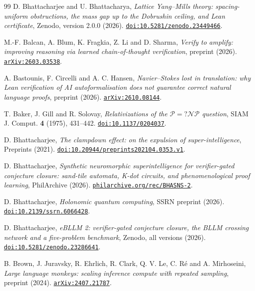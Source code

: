 \begin{thebibliography}{99}
D. Bhattacharjee and U. Bhattacharya,
\emph{Lattice Yang--Mills theory: spacing-uniform obstructions, the mass gap up to the Dobrushin ceiling, and Lean certificate},
Zenodo, version 2.0.0 (2026).
\href{https://doi.org/10.5281/zenodo.23449466}{\nolinkurl{doi:10.5281/zenodo.23449466}}.

M.-F. Balcan, A. Blum, K. Fragkia, Z. Li and D. Sharma,
\emph{Verify to amplify: improving reasoning via learned chain-of-thought verification},
preprint (2026).
\href{https://arxiv.org/abs/2603.03538}{\nolinkurl{arXiv:2603.03538}}.

A. Bastounis, F. Circelli and A. C. Hansen,
\emph{Navier--Stokes lost in translation: why Lean verification of AI autoformalisation does not guarantee correct natural language proofs},
preprint (2026).
\href{https://arxiv.org/abs/2610.08144}{\nolinkurl{arXiv:2610.08144}}.

T. Baker, J. Gill and R. Solovay,
\emph{Relativizations of the $\mathcal{P}=?\mathcal{NP}$ question},
SIAM J. Comput. \textbf{4} (1975), 431--442.
\href{https://doi.org/10.1137/0204037}{\nolinkurl{doi:10.1137/0204037}}.

D. Bhattacharjee,
\emph{The clampdown effect: on the expulsion of super-intelligence},
Preprints (2021).
\href{https://doi.org/10.20944/preprints202104.0353.v1}{\nolinkurl{doi:10.20944/preprints202104.0353.v1}}.

D. Bhattacharjee,
\emph{Synthetic neuromorphic superintelligence for verifier-gated conjecture closure: sand-tile automata, K-dot circuits, and phenomenological proof learning},
PhilArchive (2026).
\href{https://philarchive.org/rec/BHASNS-2}{\nolinkurl{philarchive.org/rec/BHASNS-2}}.

D. Bhattacharjee,
\emph{Holonomic quantum computing},
SSRN preprint (2026).
\href{https://doi.org/10.2139/ssrn.6066428}{\nolinkurl{doi:10.2139/ssrn.6066428}}.

D. Bhattacharjee,
\emph{eBLLM 2: verifier-gated conjecture closure, the BLLM crossing network and a five-problem benchmark},
Zenodo, all versions (2026).
\href{https://doi.org/10.5281/zenodo.23286641}{\nolinkurl{doi:10.5281/zenodo.23286641}}.

B. Brown, J. Juravsky, R. Ehrlich, R. Clark, Q. V. Le, C. R\'e and A. Mirhoseini,
\emph{Large language monkeys: scaling inference compute with repeated sampling},
preprint (2024).
\href{https://arxiv.org/abs/2407.21787}{\nolinkurl{arXiv:2407.21787}}.


\end{thebibliography}

